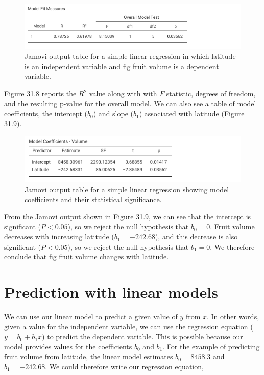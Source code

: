 \documentclass[
]{scrbook}
\begin{document}
\begin{figure}
\includegraphics[width=1\linewidth]{img/jamovi_overall_regression_output} \caption{Jamovi output table for a simple linear regression in which latitude is an independent variable and fig fruit volume is a dependent variable.}\label{fig:unnamed-chunk-168}
\end{figure}

Figure 31.8 reports the \(R^{2}\) value along with with \(F\) statistic, degrees of freedom, and the resulting p-value for the overall model.
We can also see a table of model coefficients, the intercept (\(b_{0}\)) and slope (\(b_{1}\)) associated with latitude (Figure 31.9).

\begin{figure}
\includegraphics[width=1\linewidth]{img/jamovi_overall_regression_coefficients} \caption{Jamovi output table for a simple linear regression showing model coefficients and their statistical significance.}\label{fig:unnamed-chunk-169}
\end{figure}

From the Jamovi output shown in Figure 31.9, we can see that the intercept is significant (\(P < 0.05\)), so we reject the null hypothesis that \(b_{0} = 0\).
Fruit volume decreases with increasing latitude (\(b_{1} = -242.68\)), and this decrease is also significant (\(P < 0.05\)), so we reject the null hypothesis that \(b_{1} = 0\).
We therefore conclude that fig fruit volume changes with latitude.

\hypertarget{prediction-with-linear-models}{%
\section{Prediction with linear models}\label{prediction-with-linear-models}}

We can use our linear model to predict a given value of \(y\) from \(x\).
In other words, given a value for the independent variable, we can use the regression equation (\(y = b_{0} + b_{1}x\)) to predict the dependent variable.
This is possible because our model provides values for the coefficients \(b_{0}\) and \(b_{1}\).
For the example of predicting fruit volume from latitude, the linear model estimates \(b_{0} = 8458.3\) and \(b_{1} = -242.68\).
We could therefore write our regression equation,
\end{document}
